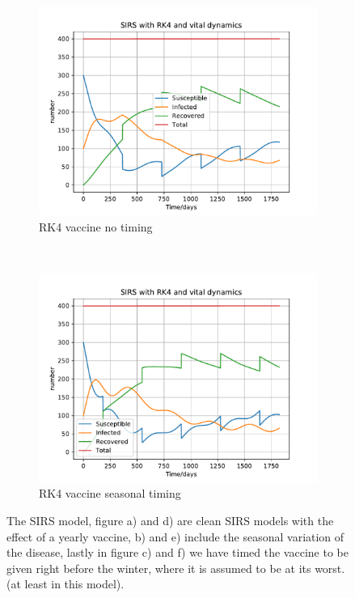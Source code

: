 \begin{figure}[H]
\begin{subfigure}{0.30\textwidth}
         \centering
         \includegraphics[width=\linewidth]{../fig/newfig/RK4Vaccine_SVA=2_f=40_T=5.pdf}
         \caption{RK4 vaccine no  timing}
    \end{subfigure}
     ~ 
    \begin{subfigure}{0.30\textwidth}
         \centering
         \includegraphics[width=\linewidth]{../fig/newfig/RK4Vaccine_SVA=4_f=40_T=5_timing.pdf}
         \caption{RK4 vaccine seasonal timing}
    \end{subfigure}
    \caption{The SIRS model, figure a) and d) are clean SIRS models with the effect of a yearly vaccine, b) and e) include the seasonal variation of the disease, lastly in figure c) and f) we have timed the vaccine to be given right before the winter, where it is assumed to be at its worst. (at least in this model).}
    \label{fig:MCVaccination}
\end{figure}





